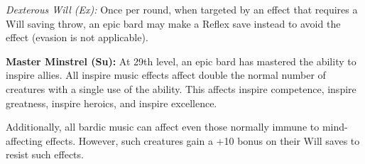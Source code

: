 \textit{Dexterous Will (Ex):} Once per round, when targeted by an effect that requires a Will saving throw, an epic bard may make a Reflex save instead to avoid the effect (evasion is not applicable).

\textbf{Master Minstrel (Su):} At 29th level, an epic bard has mastered the ability to inspire allies. All inspire music effects affect double the normal number of creatures with a single use of the ability. This affects inspire competence, inspire greatness, inspire heroics, and inspire excellence.

Additionally, all bardic music can affect even those normally immune to mind-affecting effects. However, such creatures gain a +10 bonus on their Will saves to resist such effects.
